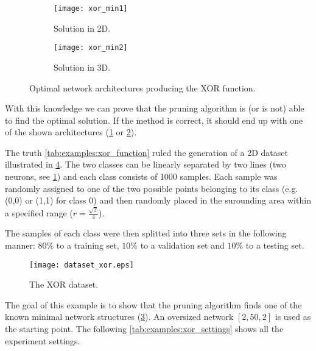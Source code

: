 \begin{figure}[H]
\centering
\begin{subfigure}{.4\textwidth}
  \centering
  \texttt{[image: xor\_min1]}
  \caption{Solution in 2D.}
  \label{fig:examples:xor_min1}
\end{subfigure}
\begin{subfigure}{.4\textwidth}
  \centering
  \texttt{[image: xor\_min2]}
  \caption{Solution in 3D.}
  \label{fig:examples:xor_min2}
\end{subfigure}
\caption{Optimal network architectures producing the XOR function.}
\label{fig:examples:xor_solutions}
\end{figure}

With this knowledge we can prove that the pruning algorithm is (or is not) able to find the optimal solution. If the method is correct, it should end up with one of the shown architectures (\cref{fig:examples:xor_min1} or \cref{fig:examples:xor_min2}).

The truth \cref{tab:examples:xor_function} ruled the generation of a 2D dataset illustrated in \cref{fig:examples:dataset_xor}. The two classes can be linearly separated by two lines (two neurons, see \cref{fig:examples:xor_min1}) and each class consists of 1000 samples. Each sample was randomly assigned to one of the two possible points belonging to its class (e.g. (0,0) or (1,1) for class 0) and then randomly placed in the surounding area within a specified range ($ r = \frac{\sqrt{2}}{4} $).

The samples of each class were then splitted into three sets in the following manner: $ 80\% $ to a training set, $ 10\% $ to a validation set and $ 10\% $ to a testing set.

\begin{figure}[H]
\centering
\texttt{[image: dataset\_xor.eps]}
\caption{The XOR dataset.}
\label{fig:examples:dataset_xor}
\end{figure}

The goal of this example is to show that the pruning algorithm finds one of the known minimal network structures (\cref{fig:examples:xor_solutions}). An oversized network $ [2, 50, 2] $ is used as the starting point. The following \cref{tab:examples:xor_settings} shows all the experiment settings.


